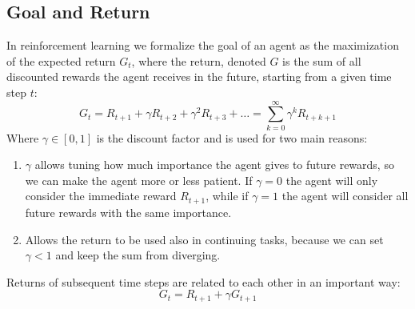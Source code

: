 \subsection{Goal and Return}
In reinforcement learning we formalize the goal of an agent as the maximization of the expected return $G_t$, where the return, denoted $G$ is the sum of all discounted rewards the agent receives in the future, starting from a given time step $t$:
\begin{equation}
    G_t = R_{t+1} + \gamma R_{t+2} + \gamma^2 R_{t+3} + \dots = \sum_{k=0}^{\infty} \gamma^k R_{t+k+1}
    \label{return}
\end{equation}
Where $\gamma \in [0, 1]$ is the discount factor and is used for two main reasons:
\begin{enumerate}
    \item $\gamma$ allows tuning how much importance the agent gives to future rewards, so we can make the agent more or less patient. If $\gamma = 0$ the agent will only consider the immediate reward $R_{t+1}$, while if $\gamma = 1$ the agent will consider all future rewards with the same importance.
    \item Allows the return to be used also in continuing tasks, because we can set $\gamma < 1$ and keep the sum from diverging.
\end{enumerate}
Returns of subsequent time steps are related to each other in an important way:
\begin{equation}
    G_t = R_{t+1} + \gamma G_{t+1}
    \label{return-recursive}
\end{equation}

